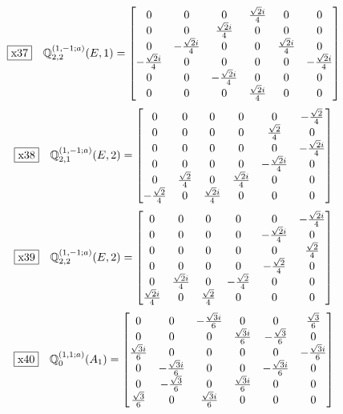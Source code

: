 \documentclass[fleqn,10pt,landscape]{jsarticle}
\begin{document}
\begin{dmath*}
\fbox{x37}\quad \mathbb{Q}_{2,2}^{(1,-1;a)}(E,1)=\begin{bmatrix} 0 & 0 & 0 & \frac{\sqrt{2} i}{4} & 0 & 0 \\ 0 & 0 & \frac{\sqrt{2} i}{4} & 0 & 0 & 0 \\ 0 & - \frac{\sqrt{2} i}{4} & 0 & 0 & \frac{\sqrt{2} i}{4} & 0 \\ - \frac{\sqrt{2} i}{4} & 0 & 0 & 0 & 0 & - \frac{\sqrt{2} i}{4} \\ 0 & 0 & - \frac{\sqrt{2} i}{4} & 0 & 0 & 0 \\ 0 & 0 & 0 & \frac{\sqrt{2} i}{4} & 0 & 0 \end{bmatrix}
\end{dmath*}
\begin{dmath*}
\fbox{x38}\quad \mathbb{Q}_{2,1}^{(1,-1;a)}(E,2)=\begin{bmatrix} 0 & 0 & 0 & 0 & 0 & - \frac{\sqrt{2}}{4} \\ 0 & 0 & 0 & 0 & \frac{\sqrt{2}}{4} & 0 \\ 0 & 0 & 0 & 0 & 0 & - \frac{\sqrt{2} i}{4} \\ 0 & 0 & 0 & 0 & - \frac{\sqrt{2} i}{4} & 0 \\ 0 & \frac{\sqrt{2}}{4} & 0 & \frac{\sqrt{2} i}{4} & 0 & 0 \\ - \frac{\sqrt{2}}{4} & 0 & \frac{\sqrt{2} i}{4} & 0 & 0 & 0 \end{bmatrix}
\end{dmath*}
\begin{dmath*}
\fbox{x39}\quad \mathbb{Q}_{2,2}^{(1,-1;a)}(E,2)=\begin{bmatrix} 0 & 0 & 0 & 0 & 0 & - \frac{\sqrt{2} i}{4} \\ 0 & 0 & 0 & 0 & - \frac{\sqrt{2} i}{4} & 0 \\ 0 & 0 & 0 & 0 & 0 & \frac{\sqrt{2}}{4} \\ 0 & 0 & 0 & 0 & - \frac{\sqrt{2}}{4} & 0 \\ 0 & \frac{\sqrt{2} i}{4} & 0 & - \frac{\sqrt{2}}{4} & 0 & 0 \\ \frac{\sqrt{2} i}{4} & 0 & \frac{\sqrt{2}}{4} & 0 & 0 & 0 \end{bmatrix}
\end{dmath*}
\begin{dmath*}
\fbox{x40}\quad \mathbb{Q}_{0}^{(1,1;a)}(A_{1})=\begin{bmatrix} 0 & 0 & - \frac{\sqrt{3} i}{6} & 0 & 0 & \frac{\sqrt{3}}{6} \\ 0 & 0 & 0 & \frac{\sqrt{3} i}{6} & - \frac{\sqrt{3}}{6} & 0 \\ \frac{\sqrt{3} i}{6} & 0 & 0 & 0 & 0 & - \frac{\sqrt{3} i}{6} \\ 0 & - \frac{\sqrt{3} i}{6} & 0 & 0 & - \frac{\sqrt{3} i}{6} & 0 \\ 0 & - \frac{\sqrt{3}}{6} & 0 & \frac{\sqrt{3} i}{6} & 0 & 0 \\ \frac{\sqrt{3}}{6} & 0 & \frac{\sqrt{3} i}{6} & 0 & 0 & 0 \end{bmatrix}
\end{dmath*}
\end{document}
